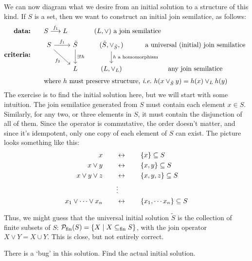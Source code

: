 We can now diagram what we desire from an initial solution to a structure of
this kind. If $S$ is a set, then we want to construct an initial join
semilatice, as follows:
\begin{align*}
    \textbf{data:}\qquad& S \overset{f_1}{\longrightarrow}L \qquad\qquad
    \text{$(L,\lor)$ a join semilatice}\\
    \textbf{criteria:}\qquad& \begin{tikzcd}[ampersand replacement=\&]
        S \arrow[r, "f_1"] \arrow[dr, swap, "f_2"] \& 
        \tilde{S}
        \arrow[d, "\exists ! h"] 
        \& (\tilde{S},\lor_{\tilde{S}},) 
        \arrow[d, "\text{$h$ a homomorphism}"] 
        \& \text{a universal (initial) join semilatice}
        \\
        {}  
        \& L \& (L,\lor_L) \& \text{any join semilatice}
    \end{tikzcd}\\
    &\text{where $h$ must preserve structure, \ie~$h(x\lor_{\tilde{S}} y) = h(x)
    \lor_L h(y)$}
\end{align*}
The exercise is to find the initial solution here, but we will start with some
intuition. The join semilatice generated from $S$ must contain each element
$x\in S$. Similarly, for any two, or three elements in $S$, it must contain the
disjunction of all of them. Since the operator is commutative, the order doesn't
matter, and since it's idempotent, only one copy of each element of $S$ can
exist. The picture looks something like this:
\begin{align*}
x  &\qquad\leftrightarrow\qquad \{ x \} \subseteq S \\
x \lor y &\qquad\leftrightarrow\qquad \{ x,y \} \subseteq S \\
x \lor y \lor z &\qquad\leftrightarrow\qquad \{ x,y,z \} \subseteq S \\
 &\qquad\vdots \\
x_1 \lor \cdots \lor x_n &\qquad\leftrightarrow\qquad \{ x_1, \cdots x_n \}
\subseteq S
\end{align*}

Thus, we might guess that the universal initial solution $\tilde{S}$ is the
collection of finite subsets of $S$:
$\mathcal{P}_{\mathrm{fin}}(S) = \{ X \mid
X \subseteq_\mathrm{fin} S \}$, with the join operator $X \lor Y = X \cup Y$.
This is close, but not entirely correct.

\begin{exercise}
There is a `bug' in this solution. Find the actual initial solution.
\end{exercise}


